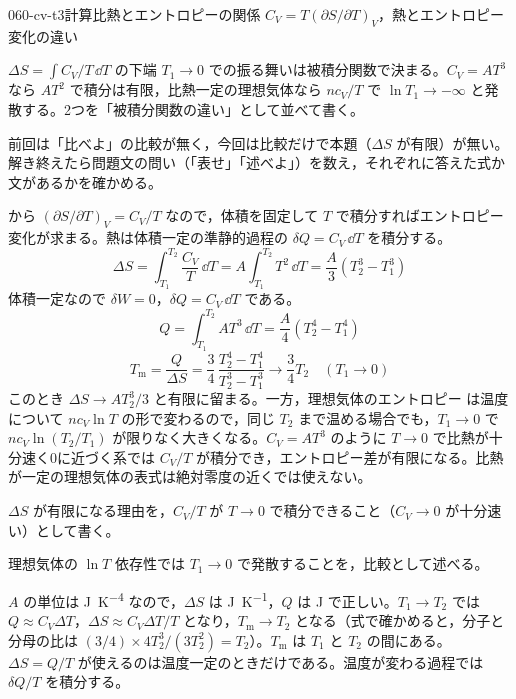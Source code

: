 \documentclass[uplatex,dvipdfmx,a4paper,11pt]{jsarticle}
\begin{document}
\begin{mondai}{060-cv-t3}{計算}{比熱とエントロピーの関係 $C_{V} = T(\partial S/\partial T)_{V}$，熱とエントロピー変化の違い}
\begin{kizuki}
\item $\Delta S=\int C_{V}/T\,\dd T$ の下端 $T_{1}\to0$ での振る舞いは被積分関数で決まる。$C_{V}=AT^{3}$ なら $AT^{2}$ で積分は有限，比熱一定の理想気体なら $nc_{V}/T$ で $\ln T_{1}\to-\infty$ と発散する。2つを「被積分関数の違い」として並べて書く。
\item {} 前回は「比べよ」の比較が無く，今回は比較だけで本題（$\Delta S$ が有限）が無い。解き終えたら問題文の問い（「表せ」「述べよ」）を数え，それぞれに答えた式か文があるかを確かめる。
\end{kizuki}
\begin{tadashii}
\houshin {} から $(\partial S/\partial T)_{V} = C_{V}/T$ なので，体積を固定して $T$ で積分すればエントロピー変化が求まる。熱は体積一定の準静的過程の $\delta Q = C_{V}\,\dd T$ を積分する。
\keisan {}
\[ \Delta S = \int_{T_{1}}^{T_{2}} \frac{C_{V}}{T}\,\dd T = A\int_{T_{1}}^{T_{2}} T^{2}\,\dd T = \frac{A}{3}\left(T_{2}^{3} - T_{1}^{3}\right) \]
 体積一定なので $\delta W = 0$，$\delta Q = C_{V}\,\dd T$ である。
\[ Q = \int_{T_{1}}^{T_{2}} AT^{3}\,\dd T = \frac{A}{4}\left(T_{2}^{4} - T_{1}^{4}\right) \]
\[ T_{\mathrm{m}} = \frac{Q}{\Delta S} = \frac{3}{4}\,\frac{T_{2}^{4} - T_{1}^{4}}{T_{2}^{3} - T_{1}^{3}} \longrightarrow \frac{3}{4}T_{2} \quad (T_{1} \to 0) \]
このとき $\Delta S \to AT_{2}^{3}/3$ と有限に留まる。一方，理想気体のエントロピー  は温度について $nc_{V}\ln T$ の形で変わるので，同じ $T_{2}$ まで温める場合でも，$T_{1} \to 0$ で $nc_{V}\ln(T_{2}/T_{1})$ が限りなく大きくなる。$C_{V} = AT^{3}$ のように $T \to 0$ で比熱が十分速く0に近づく系では $C_{V}/T$ が積分でき，エントロピー差が有限になる。比熱が一定の理想気体の表式は絶対零度の近くでは使えない。
\begin{ronten}
  \item {} $\Delta S$ が有限になる理由を，$C_{V}/T$ が $T \to 0$ で積分できること（$C_{V} \to 0$ が十分速い）として書く。
  \item {} 理想気体の $\ln T$ 依存性では $T_{1} \to 0$ で発散することを，比較として述べる。
\end{ronten}
\kenzan $A$ の単位は \unit{\joule\per\kelvin\tothe{4}} なので，$\Delta S$ は \unit{\joule\per\kelvin}，$Q$ は \unit{\joule} で正しい。$T_{1} \to T_{2}$ では $Q \approx C_{V}\Delta T$，$\Delta S \approx C_{V}\Delta T/T$ となり，$T_{\mathrm{m}} \to T_{2}$ となる（式で確かめると，分子と分母の比は $(3/4) \times 4T_{2}^{3}/(3T_{2}^{2}) = T_{2}$）。$T_{\mathrm{m}}$ は $T_{1}$ と $T_{2}$ の間にある。
\tsumazuki $\Delta S = Q/T$ が使えるのは温度一定のときだけである。温度が変わる過程では $\delta Q/T$ を積分する。
\end{tadashii}
\end{mondai}
\end{document}
